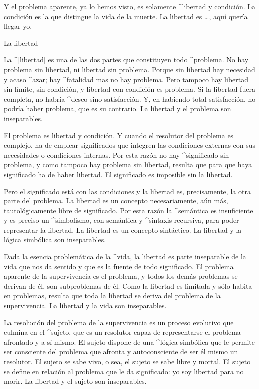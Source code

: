 Y el problema aparente, ya lo hemos visto, es solamente ^{libertad} y
condición. La condición es la que distingue la vida de la muerte. La
libertad es \dots, aquí quería llegar yo.


\Section La libertad

La ^|libertad| es una de las dos partes que constituyen todo
^{problema}. No hay problema sin libertad, ni libertad sin problema.
Porque sin libertad hay necesidad y acaso ^{azar}; hay ^{fatalidad} mas
no hay problema. Pero tampoco hay libertad sin límite, sin condición, y
libertad con condición es problema. Si la libertad fuera completa, no
habría ^{deseo} sino satisfacción. Y, en habiendo total satisfacción, no
podría haber problema, que es su contrario. La libertad y el problema
son inseparables.

El problema es libertad y condición. Y cuando el resolutor del problema
es complejo, ha de emplear significados que integren las condiciones
externas con sus necesidades o condiciones internas. Por esta razón no
hay ^{significado} sin problema, y como tampoco hay problema sin
libertad, resulta que para que haya significado ha de haber libertad. El
significado es imposible sin la libertad.

Pero el significado está con las condiciones y la libertad es,
precisamente, la otra parte del problema. La libertad es un concepto
necesariamente, aún más, tautológicamente libre de significado. Por esta
razón la ^{semántica} es insuficiente y es preciso un ^{simbolismo}, con
semántica y ^{sintaxis} recursiva, para poder representar la libertad.
La libertad es un concepto sintáctico. La libertad y la lógica simbólica
son inseparables.

Dada la esencia problemática de la ^{vida}, la libertad es parte
inseparable de la vida que nos da sentido y que es la fuente de todo
significado. El problema aparente de la supervivencia es el problema, y
todos los demás problemas se derivan de él, son subproblemas de él. Como
la libertad es limitada y sólo habita en problemas, resulta que toda la
libertad se deriva del problema de la supervivencia. La libertad y la
vida son inseparables.

La resolución del problema de la supervivencia es un proceso evolutivo
que culmina en el ^{sujeto}, que es un resolutor capaz de representarse
el problema afrontado y a sí mismo. El sujeto dispone de una ^{lógica
simbólica} que le permite ser consciente del problema que afronta y
autoconsciente de ser él mismo un resolutor. El sujeto se sabe vivo, o
sea, el sujeto se sabe libre y mortal. El sujeto se define en relación
al problema que le da significado: yo soy libertad para no morir. La
libertad y el sujeto son inseparables.

